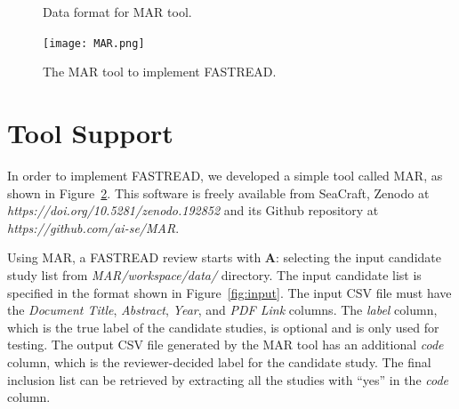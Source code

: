 \documentclass[final,twocolumn,5p]{elsarticle}
\theoremstyle{break}
\begin{document}
\begin{figure}[!t]
    \centering
    
    \caption{Data format for MAR tool.}
    \label{fig:csv}
\end{figure}
\begin{figure}[!t]
    \centering
    \texttt{[image: MAR.png]}
    \caption{The MAR tool to implement FASTREAD.}
    \label{fig:MAR}
\end{figure}

\section{Tool Support}
\label{sect: tool}

In order to implement FASTREAD, we developed a simple tool called MAR, as shown in Figure~\ref{fig:MAR}. This software is freely available
from SeaCraft, Zenodo at \textit{https://doi.org/10.5281/zenodo.192852} and its Github repository at \textit{https://github.com/ai-se/MAR}. 


Using MAR, a FASTREAD review starts with \textbf{A}: selecting the input candidate study list from \textit{MAR/workspace/data/} directory. The input candidate list is specified in the format shown in Figure~\ref{fig:input}. The input CSV file must have the \textit{Document Title}, \textit{Abstract}, \textit{Year}, and \textit{PDF Link} columns. The \textit{label} column, which is the true label of the candidate studies, is optional and is only used for testing. The output CSV file generated by the MAR tool has an additional \textit{code} column, which is the reviewer-decided label for the candidate study. The final inclusion list can be retrieved by extracting all the studies with ``yes'' in the \textit{code} column.
\end{document}
